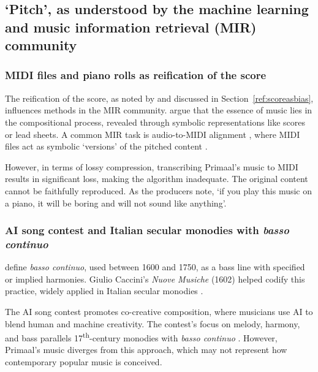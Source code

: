\documentclass{article}
\begin{document}
\subsection{`Pitch', as understood by the machine learning and music information retrieval (MIR) community}\label{ref:mircommunity}

\subsubsection{MIDI files and piano rolls as reification of the score}


The reification of the score, as noted by \citet[pp.~104--105]{middleton1990studying} and discussed in Section~\ref{ref:scoreasbias}, influences methods in the MIR community. \citet[sec. 4.2]{briot2020deep} argue that the essence of music lies in the compositional process, revealed through symbolic representations like scores or lead sheets. A common MIR task is audio-to-MIDI alignment \citep{raffel2016optimizing}, where MIDI files act as symbolic `versions' of the pitched content \citep{raffel2016learning,benetos2018automatic}.


However, in terms of lossy compression, transcribing Primaal's music to MIDI results in significant loss, making the algorithm inadequate. The original content cannot be faithfully reproduced. As the producers note, `if you play this music on a piano, it will be boring and will not sound like anything'.


\subsubsection{AI song contest and Italian secular monodies with \emph{basso continuo}}\label{sec:AIsongcontest}


\citet{ashworth2012basso} define \emph{basso continuo}, used between 1600 and 1750, as a bass line with specified or implied harmonies. Giulio Caccini's \emph{Nuove Musiche} (1602) helped codify this practice, widely applied in Italian secular monodies \citep{caccini1978nuove,williams2001continuo}.



The AI song contest \citep{aisongcontest2024} promotes co-creative composition, where musicians use AI to blend human and machine creativity. The contest's focus on melody, harmony, and bass \citep{AIsongcontest_long} parallels 17\textsuperscript{th}-century monodies with \emph{basso continuo} \citep{deguernel2022personalizing}. However, Primaal's music diverges from this approach, which may not represent how contemporary popular music is conceived.
\end{document}
